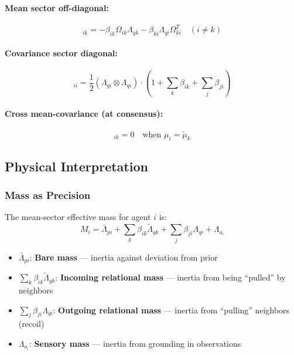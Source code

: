 \documentclass[12pt]{article}
\begin{document}
\paragraph{Mean sector off-diagonal:}
\begin{equation}
[\mathbf{M}^\mu]_{ik} = -\beta_{ik}\Omega_{ik}\Lambda_{qk} - \beta_{ki}\Lambda_{qi}\Omega_{ki}^T \quad (i \neq k)
\end{equation}

\paragraph{Covariance sector diagonal:}
\begin{equation}
[\mathbf{M}^\Sigma]_{ii} = \frac{1}{2}(\Lambda_{qi} \otimes \Lambda_{qi}) \cdot \left(1 + \sum_k \beta_{ik} + \sum_j \beta_{ji}\right)
\end{equation}

\paragraph{Cross mean-covariance (at consensus):}
\begin{equation}
[\mathbf{C}^{\mu\Sigma}]_{ik} = 0 \quad \text{when } \mu_i = \tilde{\mu}_k
\end{equation}

\subsection{Physical Interpretation}

\subsubsection{Mass as Precision}

The mean-sector effective mass for agent $i$ is:
\begin{equation}
\boxed{
M_i = \bar{\Lambda}_{pi} + \sum_k \beta_{ik}\tilde{\Lambda}_{qk} + \sum_j \beta_{ji}\Lambda_{qi} + \Lambda_{o_i}
}
\label{eq:effective_mass}
\end{equation}

\begin{itemize}
    \item $\bar{\Lambda}_{pi}$: \textbf{Bare mass} --- inertia against deviation from prior
    \item $\sum_k \beta_{ik}\tilde{\Lambda}_{qk}$: \textbf{Incoming relational mass} --- inertia from being ``pulled'' by neighbors
    \item $\sum_j \beta_{ji}\Lambda_{qi}$: \textbf{Outgoing relational mass} --- inertia from ``pulling'' neighbors (recoil)
    \item $\Lambda_{o_i}$: \textbf{Sensory mass} --- inertia from grounding in observations
\end{itemize}
\end{document}
